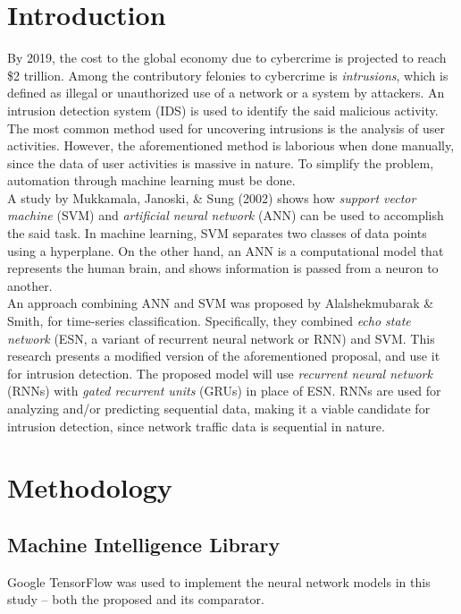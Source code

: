 \section{Introduction}

By 2019, the cost to the global economy due to cybercrime is projected to reach \$2 trillion\cite{Juniper}. Among the contributory felonies to cybercrime is \textit{intrusions}, which is defined as illegal or unauthorized use of a network or a system by attackers\cite{Ghosh}. An intrusion detection system (IDS) is used to identify the said malicious activity\cite{Ghosh}. The most common method used for uncovering intrusions is the analysis of user activities\cite{Ghosh, Kumar, Mukkamala}. However, the aforementioned method is laborious when done manually, since the data of user activities is massive in nature\cite{Frank, Lincoln}. To simplify the problem, automation through machine learning must be done.\\
\indent	A study by Mukkamala, Janoski, \& Sung (2002)\cite{Mukkamala} shows how \textit{support vector machine} (SVM) and \textit{artificial neural network} (ANN) can be used to accomplish the said task. In machine learning, SVM separates two classes of data points using a hyperplane\cite{Cortes}. On the other hand, an ANN is a computational model that represents the human brain, and shows information is passed from a neuron to another\cite{Negnevitsky}.\\
\indent	An approach combining ANN and SVM was proposed by Alalshekmubarak \& Smith\cite{Alalshekmubarak}, for time-series classification. Specifically, they combined \textit{echo state network} (ESN, a variant of recurrent neural network or RNN) and SVM. This research presents a modified version of the aforementioned proposal, and use it for intrusion detection. The proposed model will use \textit{recurrent neural network} (RNNs) with \textit{gated recurrent units} (GRUs) in place of ESN. RNNs are used for analyzing and/or predicting sequential data, making it a viable candidate for intrusion detection\cite{Negnevitsky}, since network traffic data is sequential in nature.

\section{Methodology}
\subsection{Machine Intelligence Library}
Google TensorFlow\cite{tensorflow2015-whitepaper} was used to implement the neural network models in this study -- both the proposed and its comparator. 

